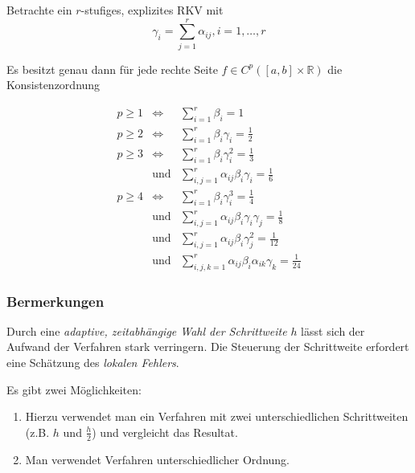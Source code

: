 \documentclass[10pt,a4paper]{article}
\begin{document}
\begin{satz}
Betrachte ein $r$-stufiges, explizites RKV mit $$\gamma_i = \sum^{r}_{j=1} \alpha_{ij}, i=1, \ldots , r$$

Es besitzt genau dann für jede rechte Seite $f \in C^{p}([a,b]\times \mathbb{R})$ die Konsistenzordnung


\begin{eqnarray*}
p \geq 1 &\Leftrightarrow & \sum^{r}_{i=1} \beta_i=1 \\
p \geq 2 & \Leftrightarrow & \sum^{r}_{i=1} \beta_i \gamma_i =\frac{1}{2}\\
p \geq 3 & \Leftrightarrow & \sum^{r}_{i=1} \beta_i \gamma_i^{2} =\frac{1}{3}\\ &\text{und}& \sum^{r}_{i,j=1} \alpha_{ij} \beta_i \gamma_i =\frac{1}{6}\\
p \geq 4 & \Leftrightarrow & \sum^{r}_{i=1} \beta_i \gamma_i^{3} =\frac{1}{4} \\
& \text{und}& \sum^{r}_{i,j=1} \alpha_{ij} \beta_i \gamma_i \gamma_j =\frac{1}{8}     \\ &\text{und} &\sum^{r}_{i,j=1} \alpha_{ij} \beta_i  \gamma_j^{2} =\frac{1}{12} \\
& \text{und}& \sum^{r}_{i,j,k=1} \alpha_{ij} \beta_i \alpha_{ik} \gamma_k =\frac{1}{24}
\end{eqnarray*}



\end{satz}


\subsubsection{Bermerkungen}

Durch eine \emph{adaptive, zeitabhängige Wahl der Schrittweite} $h$ lässt sich der Aufwand der Verfahren stark verringern. Die Steuerung der Schrittweite erfordert eine Schätzung des \emph{lokalen Fehlers}.

Es gibt zwei Möglichkeiten:

\begin{enumerate}
\item Hierzu verwendet man ein Verfahren mit zwei unterschiedlichen Schrittweiten (z.B. $h$ und $\frac{h}{2}$) und vergleicht das Resultat.
\item Man verwendet Verfahren unterschiedlicher Ordnung.

\end{enumerate}
\end{document}
